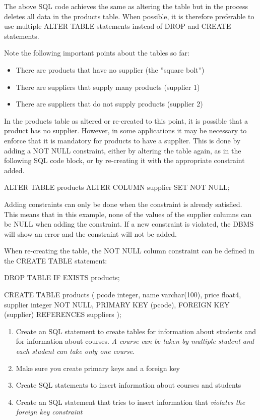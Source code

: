 The above SQL code achieves the same as altering the table but in the process deletes all data in the products table. When possible, it is therefore preferable to use multiple ALTER TABLE statements instead of DROP and CREATE statements. 

Note the following important points about the tables so far:
\begin{itemize}
  \item There are products that have no supplier (the ''square bolt'')
  \item There are suppliers that supply many products (supplier 1)
  \item There are suppliers that do not supply products (supplier 2)
\end{itemize}

In the products table as altered or re-created to this point, it is possible that a product has no supplier. However, in some applications it may be necessary to enforce that it is mandatory for products to have a supplier. This is done by adding a NOT NULL constraint, either by altering the table again, as in the following SQL code block, or by re-creating it with the appropriate constraint added.

\begin{sqlcode}
ALTER TABLE products ALTER COLUMN supplier SET NOT NULL;
\end{sqlcode}

Adding constraints can only be done when the constraint is already satisfied. This means that in this example, none of the values of the supplier columns can be NULL when adding the constraint. If a new constraint is violated, the DBMS will show an error and the constraint will not be added.

When re-creating the table, the NOT NULL column constraint can be defined in the CREATE TABLE statement:

\begin{sqlcode}
DROP TABLE IF EXISTS products;

CREATE TABLE products (
  pcode    integer,
  name     varchar(100),
  price    float4,
  supplier integer NOT NULL,
  PRIMARY KEY (pcode),
  FOREIGN KEY (supplier) REFERENCES suppliers 
);
\end{sqlcode}

\begin{exerciseboxpaper}
\begin{enumerate}
\item Create an SQL statement to create tables for information about students and for information about courses. \emph{A course can be taken by multiple student and each student can take only one course.}
\item Make sure you create primary keys and a foreign key
\item Create SQL statements to insert information about courses and students
\item Create an SQL statement that tries to insert information that \emph{violates the foreign key constraint}
\end{enumerate}
\end{exerciseboxpaper}


